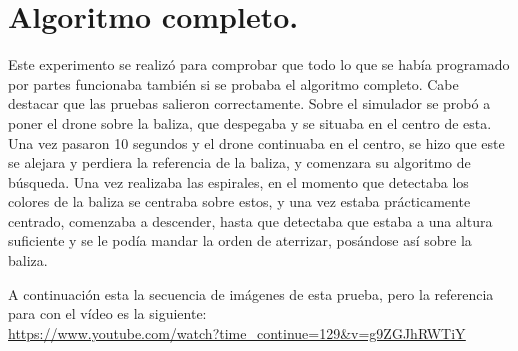 \section{Algoritmo completo. }
\hspace{1cm} Este experimento se realiz\'o para comprobar que todo lo que se hab\'ia programado por partes funcionaba tambi\'en si se probaba el algoritmo completo. Cabe destacar que las pruebas salieron correctamente. Sobre el simulador se prob\'o a poner el drone sobre la baliza, que despegaba y se situaba en el centro de esta. Una vez pasaron 10 segundos y el drone continuaba en el centro, se hizo que este se alejara y perdiera la referencia de la baliza, y comenzara su algoritmo de b\'usqueda. Una vez realizaba las espirales, en el momento que detectaba los colores de la baliza se centraba sobre estos, y una vez estaba pr\'acticamente centrado, comenzaba a descender, hasta que detectaba que estaba a una altura suficiente y se le pod\'ia mandar la orden de aterrizar, pos\'andose as\'i sobre la baliza. 

A continuaci\'on esta la secuencia de im\'agenes de esta prueba, pero la referencia para con el v\'	ideo es la siguiente:\\
\underline{\url{https://www.youtube.com/watch?time_continue=129&v=g9ZGJhRWTiY}}

